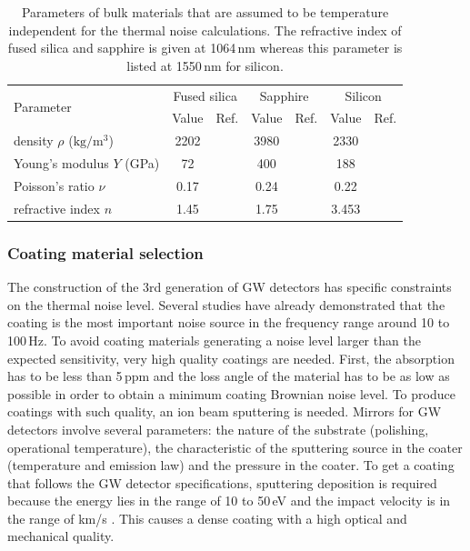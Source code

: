 \begin{table}
\begin{center}
\begin{tabular}{|l|c|c|c|c|c|c|} \hline
\multirow{2}{*}{Parameter} & \multicolumn{2}{c|}{Fused silica} & \multicolumn{2}{c|}{Sapphire} & \multicolumn{2}{c|}{Silicon} \\ 
					    & Value & Ref. & Value & Ref. & Value & Ref. \\ \hline
density $\rho$ ($\mathrm{kg/m^3}$) & 2202 & \cite{Nawrodt2009_ET} & 3980 & \cite{Nawrodt2009_ET} & 2330 & \cite{Nawrodt2009_ET} \\ 
Young's modulus $Y$ (GPa)& 72 & \cite{Nawrodt2009_ET} & 400 & \cite{Nawrodt2009_ET} & 188 & \cite{Nawrodt2009_ET} \\
Poisson's ratio $\nu$ & 0.17 & \cite{Nawrodt2009_ET} & 0.24 & \cite{MPDB} & 0.22 & \cite{Nawrodt2009_ET}  \\ 
refractive index $n$ & 1.45 & \cite{Franc2009} & 1.75 & \cite{Franc2009} & 3.453 & \cite{Franc2009} \\
\hline
\end{tabular}
\end{center}
\caption{Parameters of bulk materials that are assumed to be temperature independent for the thermal noise calculations. The refractive index of fused silica and sapphire is given at 1064\,nm whereas this parameter is listed at 1550\,nm for silicon.}
\label{tab:tn_param}
\end{table}

\FloatBarrier
\subsubsection{Coating material selection}

The construction of the 3rd generation of GW detectors has specific constraints on the thermal noise level. Several studies have already demonstrated that the coating is the most important noise source in the frequency range around 10 to 100\,Hz. To avoid coating materials generating a noise level larger than the expected sensitivity, very high quality coatings are needed. First, the absorption has to be less than 5\,ppm and the loss angle of the material has to be as low as possible in order to obtain a minimum coating Brownian noise level. To produce coatings with such quality, an ion beam sputtering is needed. Mirrors for GW detectors involve several parameters: the nature of the substrate (polishing, operational temperature), the characteristic of the sputtering source in the coater (temperature and emission law) and the pressure in the coater. To get a coating that follows the GW detector specifications, sputtering deposition is required because the energy lies in the range of 10 to 50\,eV and the impact velocity is in the range of km/s \cite{Mackowski2005}. This causes a dense coating with a high optical and mechanical quality.
 
